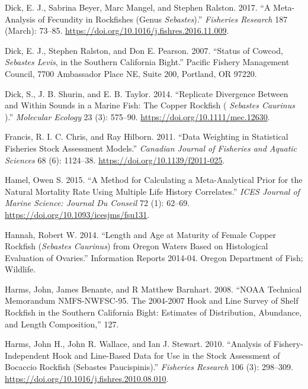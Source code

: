 \documentclass[11pt,
  english,
  a4paper,
]{article}
\begin{document}
\begin{cslreferences}
\leavevmode\hypertarget{ref-dick_meta-analysis_2017}{}%
Dick, E. J., Sabrina Beyer, Marc Mangel, and Stephen Ralston. 2017. ``A Meta-Analysis of Fecundity in Rockfishes (Genus \emph{Sebastes}).'' \emph{Fisheries Research} 187 (March): 73--85. \url{https://doi.org/10.1016/j.fishres.2016.11.009}.

\leavevmode\hypertarget{ref-dick_status_2007}{}%
Dick, E. J., Stephen Ralston, and Don E. Pearson. 2007. ``Status of Cowcod, \emph{Sebastes Levis}, in the Southern California Bight.'' Pacific Fishery Management Council, 7700 Ambassador Place NE, Suite 200, Portland, OR 97220.

\leavevmode\hypertarget{ref-dick_replicate_2014}{}%
Dick, S., J. B. Shurin, and E. B. Taylor. 2014. ``Replicate Divergence Between and Within Sounds in a Marine Fish: The Copper Rockfish ( \emph{Sebastes Caurinus} ).'' \emph{Molecular Ecology} 23 (3): 575--90. \url{https://doi.org/10.1111/mec.12630}.

\leavevmode\hypertarget{ref-francis_data_2011}{}%
Francis, R. I. C. Chris, and Ray Hilborn. 2011. ``Data Weighting in Statistical Fisheries Stock Assessment Models.'' \emph{Canadian Journal of Fisheries and Aquatic Sciences} 68 (6): 1124--38. \url{https://doi.org/10.1139/f2011-025}.

\leavevmode\hypertarget{ref-hamel_method_2015}{}%
Hamel, Owen S. 2015. ``A Method for Calculating a Meta-Analytical Prior for the Natural Mortality Rate Using Multiple Life History Correlates.'' \emph{ICES Journal of Marine Science: Journal Du Conseil} 72 (1): 62--69. \url{https://doi.org/10.1093/icesjms/fsu131}.

\leavevmode\hypertarget{ref-hannah_length_2014}{}%
Hannah, Robert W. 2014. ``Length and Age at Maturity of Female Copper Rockfish (\emph{Sebastes Caurinus}) from Oregon Waters Based on Histological Evaluation of Ovaries.'' Information Reports 2014-04. Oregon Department of Fish; Wildlife.

\leavevmode\hypertarget{ref-harms_noaa_2008}{}%
Harms, John, James Benante, and R Matthew Barnhart. 2008. ``NOAA Technical Memorandum NMFS-NWFSC-95. The 2004-2007 Hook and Line Survey of Shelf Rockfish in the Southern California Bight: Estimates of Distribution, Abundance, and Length Composition,'' 127.

\leavevmode\hypertarget{ref-harms_analysis_2010}{}%
Harms, John H., John R. Wallace, and Ian J. Stewart. 2010. ``Analysis of Fishery-Independent Hook and Line-Based Data for Use in the Stock Assessment of Bocaccio Rockfish (Sebastes Paucispinis).'' \emph{Fisheries Research} 106 (3): 298--309. \url{https://doi.org/10.1016/j.fishres.2010.08.010}.


\end{cslreferences}
\end{document}
